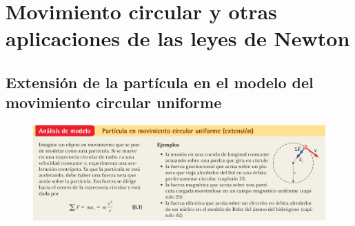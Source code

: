 \section{Movimiento circular y otras aplicaciones de las leyes de Newton}
  \subsection{Extensión de la partícula en el modelo del movimiento circular uniforme}
    \begin{figure}[H]
      \centering
      \includegraphics[scale=0.4]{1/graphics_6/figure_0}
    \end{figure}

  \subsection{}
